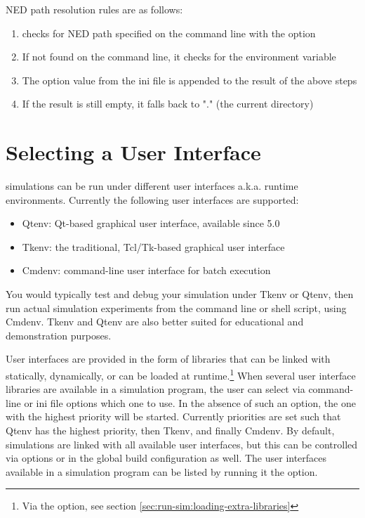 NED path resolution rules are as follows:

\begin{enumerate}
  \item {\opp} checks for NED path specified on the command line with the  option
  \item If not found on the command line, it checks for the  environment variable
  \item The  option value from the ini file is appended to the result of the above steps
  \item If the result is still empty, it falls back to "." (the current directory)
\end{enumerate}


\section{Selecting a User Interface}
\label{sec:run-sim:selecting-user-interface}

{\opp} simulations can be run under different user interfaces a.k.a. runtime
environments. Currently the following user interfaces are supported:

\begin{itemize}
  \item Qtenv: Qt-based graphical user interface, available since {\opp} 5.0
  \item Tkenv: the traditional, Tcl/Tk-based graphical user interface
  \item Cmdenv: command-line user interface for batch execution
\end{itemize}

You would typically test and debug your simulation under Tkenv or Qtenv,
then run actual simulation experiments from the command line or shell
script, using Cmdenv. Tkenv and Qtenv are also better suited for
educational and demonstration purposes.

User interfaces are provided in the form of libraries that can be linked with
statically, dynamically, or can be loaded at runtime.\footnote{Via the 
option, see section \ref{sec:run-sim:loading-extra-libraries}} When several user
interface libraries are available in a simulation program, the user can select
via command-line or ini file options which one to use. In the absence of such an
option, the one with the highest priority will be started. Currently priorities
are set such that Qtenv has the highest priority, then Tkenv, and finally
Cmdenv. By default, simulations are linked with all available user interfaces,
but this can be controlled via  options or in the {\opp}
global build configuration as well. The user interfaces available in a
simulation program can be listed by running it the 
option.

